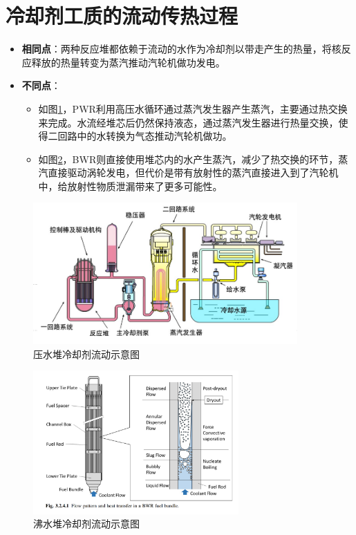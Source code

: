 \documentclass{article}
\begin{document}
\section{冷却剂工质的流动传热过程}
\begin{itemize}
    \item \textbf{相同点}：两种反应堆都依赖于流动的水作为冷却剂以带走产生的热量，将核反应释放的热量转变为蒸汽推动汽轮机做功发电。
    \item \textbf{不同点}：
    \begin{itemize}
        \item 如图\ref{fig:PWR-water}，PWR利用高压水循环通过蒸汽发生器产生蒸汽，主要通过热交换来完成。水流经堆芯后仍然保持液态，通过蒸汽发生器进行热量交换，使得二回路中的水转换为气态推动汽轮机做功。
        \item 如图\ref{fig:BWR-water}，BWR则直接使用堆芯内的水产生蒸汽，减少了热交换的环节，蒸汽直接驱动涡轮发电，但代价是带有放射性的蒸汽直接进入到了汽轮机中，给放射性物质泄漏带来了更多可能性。
    \end{itemize}
\end{itemize}

\begin{figure}[htbp]
    \centering
    \includegraphics[width=0.9\textwidth]{figures/PWR-water.png}
    \caption{压水堆冷却剂流动示意图}
    \label{fig:PWR-water}
\end{figure}

\begin{figure}[htbp]
    \centering
    \includegraphics[width=0.7\textwidth]{figures/BWR-water.png}
    \caption{沸水堆冷却剂流动示意图}
    \label{fig:BWR-water}
\end{figure}


\end{document}
